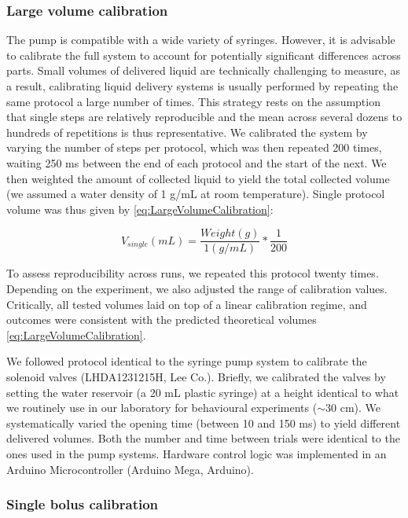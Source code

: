 \subsubsection*{Large volume calibration}
The pump is compatible with a wide variety of syringes. However, it is advisable to calibrate the full system to account for potentially significant differences across parts. Small volumes of delivered liquid are technically challenging to measure, as a result, calibrating liquid delivery systems is usually performed by repeating the same protocol a large number of times. This strategy rests on the assumption that single steps are relatively reproducible and the mean across several dozens to hundreds of repetitions is thus representative. We calibrated the system by varying the number of steps per protocol, which was then repeated 200 times, waiting 250 ms between the end of each protocol and the start of the next. We then weighted the amount of collected liquid to yield the total collected volume (we assumed a water density of 1 g/mL at room temperature). Single protocol volume was thus given by \ref{eq:LargeVolumeCalibration}:

\begin{equation} \label{eq:LargeVolumeCalibration}
    V_{single}(mL) = \frac{Weight (g)}{1 (g/mL)} * \frac{1}{200}
    \end{equation}

To assess reproducibility across runs, we repeated this protocol twenty times. Depending on the experiment, we also adjusted the range of calibration values. Critically, all tested volumes laid on top of a linear calibration regime, and outcomes were consistent with the predicted theoretical volumes \cref{eq:LargeVolumeCalibration}.

We followed protocol identical to the syringe pump system to calibrate the solenoid valves (LHDA1231215H, Lee Co.). Briefly, we calibrated the valves by setting the water reservoir (a 20 mL plastic syringe) at a height identical to what we routinely use in our laboratory for behavioural experiments ($\sim$30 cm). We systematically varied the opening time (between 10 and 150 ms) to yield different delivered volumes. Both the number and time between trials were identical to the ones used in the pump systems. Hardware control logic was implemented in an Arduino Microcontroller (Arduino Mega, Arduino).

\subsubsection*{Single bolus calibration}


